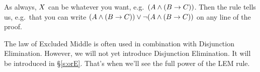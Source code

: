 As always, $X$ can be whatever you want, e.g.~$(A\mathbin{\wedge}(B\rightarrow C))$. Then the rule tells us, e.g.~that you can write $(A\mathbin{\wedge}(B\rightarrow C))\vee\neg(A\mathbin{\wedge}(B\rightarrow C))$ on any line of the proof.


The law of Excluded Middle is often used in combination with Disjunction Elimination. 
However, we will not yet introduce Disjunction Elimination. It will be introduced in \S\ref{s:orE}. That's when we'll see the full power of the LEM rule. 


%
%
%
%
%



